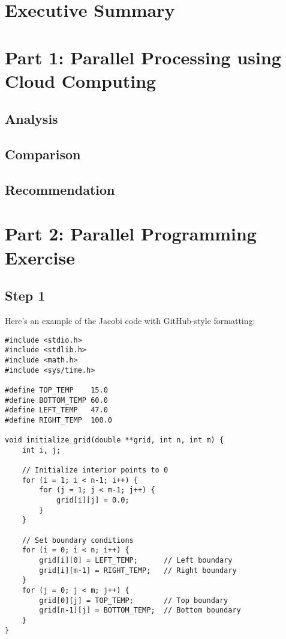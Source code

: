 \documentclass{article}
\begin{document}
\begin{cwauthorlist}
\end{cwauthorlist}

\section{Executive Summary}

\section{Part 1: Parallel Processing using Cloud Computing}

\subsection{Analysis}

\subsection{Comparison}

\subsection{Recommendation}

\section{Part 2: Parallel Programming Exercise}

\subsection{Step 1}

Here's an example of the Jacobi code with GitHub-style formatting:

\begin{lstlisting}[style=CStyle, caption={Example of Jacobi 2D Implementation}]
#include <stdio.h>
#include <stdlib.h>
#include <math.h>
#include <sys/time.h>

#define TOP_TEMP    15.0
#define BOTTOM_TEMP 60.0
#define LEFT_TEMP   47.0
#define RIGHT_TEMP  100.0

void initialize_grid(double **grid, int n, int m) {
    int i, j;
    
    // Initialize interior points to 0
    for (i = 1; i < n-1; i++) {
        for (j = 1; j < m-1; j++) {
            grid[i][j] = 0.0;
        }
    }
    
    // Set boundary conditions
    for (i = 0; i < n; i++) {
        grid[i][0] = LEFT_TEMP;      // Left boundary
        grid[i][m-1] = RIGHT_TEMP;   // Right boundary
    }
    for (j = 0; j < m; j++) {
        grid[0][j] = TOP_TEMP;       // Top boundary
        grid[n-1][j] = BOTTOM_TEMP;  // Bottom boundary
    }
}
\end{lstlisting}
\end{document}
